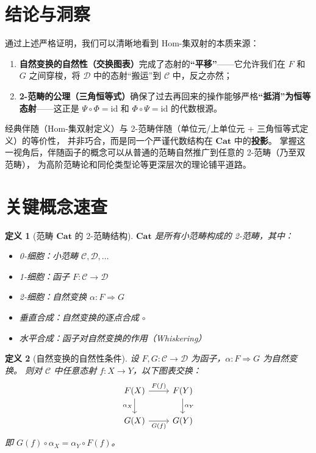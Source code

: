 \documentclass[12pt,a4paper]{ctexart}
\newtheorem{definition}{定义}[section]
\theoremstyle{definition}
\newcommand{\cat}[1]{\mathbf{#1}}
\newcommand{\Cat}{\cat{Cat}}
\newcommand{\id}{\mathrm{id}}
\begin{document}
\section{结论与洞察}

通过上述严格证明，我们可以清晰地看到 Hom-集双射的本质来源：

\begin{enumerate}[leftmargin=*]
    \item \textbf{自然变换的自然性（交换图表）}完成了态射的\textbf{“平移”}——它允许我们在 $F$ 和 $G$ 之间穿梭，将 $\mathcal{D}$ 中的态射“搬运”到 $\mathcal{C}$ 中，反之亦然；
    
    \item \textbf{2-范畴的公理（三角恒等式）}确保了过去再回来的操作能够严格\textbf{“抵消”为恒等态射}——这正是 $\Psi \circ \Phi = \id$ 和 $\Phi \circ \Psi = \id$ 的代数根源。
\end{enumerate}

经典伴随（Hom-集双射定义）与 2-范畴伴随（单位元/上单位元 + 三角恒等式定义）的等价性，
并非巧合，而是同一个严谨代数结构在 $\Cat$ 中的\textbf{投影}。
掌握这一视角后，伴随函子的概念可以从普通的范畴自然推广到任意的 2-范畴（乃至双范畴），
为高阶范畴论和同伦类型论等更深层次的理论铺平道路。

\appendix
\section{关键概念速查}

\begin{definition}[范畴 $\Cat$ 的 2-范畴结构]
$\Cat$ 是所有小范畴构成的 2-范畴，其中：
\begin{itemize}[leftmargin=*]
    \item 0-细胞：小范畴 $\mathcal{C}, \mathcal{D}, \dots$
    \item 1-细胞：函子 $F: \mathcal{C} \to \mathcal{D}$
    \item 2-细胞：自然变换 $\alpha: F \Rightarrow G$
    \item 垂直合成：自然变换的逐点合成 $\circ$
    \item 水平合成：函子对自然变换的作用（Whiskering）
\end{itemize}
\end{definition}

\begin{definition}[自然变换的自然性条件]
设 $F, G: \mathcal{C} \to \mathcal{D}$ 为函子，$\alpha: F \Rightarrow G$ 为自然变换。
则对 $\mathcal{C}$ 中任意态射 $f: X \to Y$，以下图表交换：
\[
\begin{tikzcd}
F(X) \ar[r, "F(f)"] \ar[d, "\alpha_X"'] & F(Y) \ar[d, "\alpha_Y"] \\
G(X) \ar[r, "G(f)"'] & G(Y)
\end{tikzcd}
\]
即 $G(f) \circ \alpha_X = \alpha_Y \circ F(f)$。
\end{definition}
\end{document}
